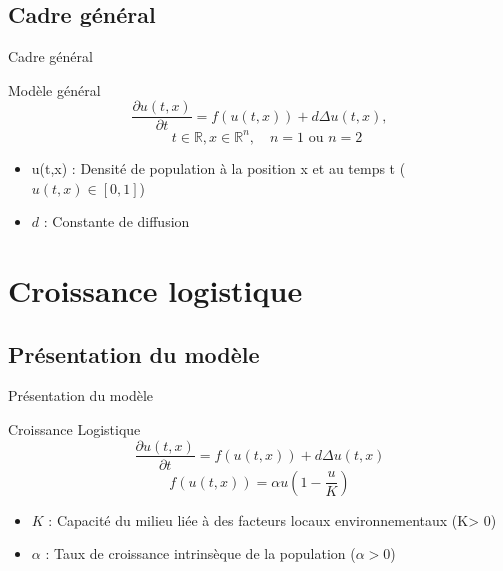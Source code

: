 \documentclass[10pt]{beamer}
\begin{document}
\subsection{Cadre général}

\begin{frame}{Cadre général}{}
\begin{block}{Modèle général}
	\begin{equation}
		\frac{\partial u(t,x)}{\partial t}=f(u(t,x))+d\Delta u(t,x),
	\end{equation}
	\vspace{0.1cm}
	$$	\quad t \in \mathbb{R}, x \in \mathbb{R}^n, \quad n=1 \text{ ou } n=2$$

	
\end{block}
\begin{itemize}
	\item u(t,x) : Densité de population à la position x et au temps t ($ u(t,x) \in[0,1]$) 
    \item $d$ : Constante de diffusion 
\end{itemize}
\end{frame}

\section{Croissance logistique}
\subsection{Présentation du modèle}
\begin{frame}{Présentation du modèle}{}
\begin{block}{Croissance Logistique}
	$$\frac{\partial u(t,x)}{\partial t}=f(u(t,x))+d\Delta u(t,x)$$
	$$f(u(t,x))=\alpha u (1 - \dfrac{u}{K}) $$
\end{block}
\begin{itemize}
    \item $K$ : Capacité du milieu liée à des facteurs locaux environnementaux (K> 0) 
    \item $\alpha$ : Taux de croissance intrinsèque de la population ($\alpha >0$)
\end{itemize}
\end{frame}
\end{document}
